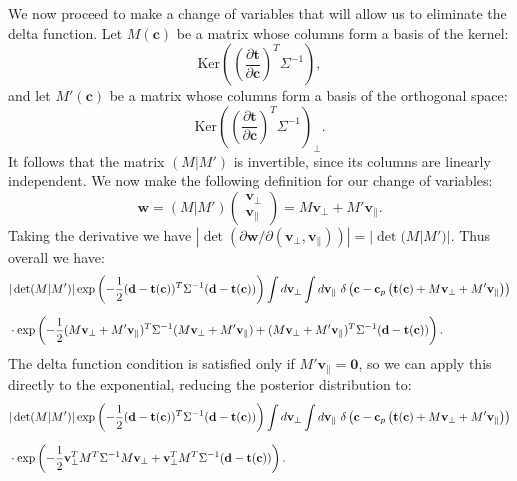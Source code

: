 \documentclass[withindex,glossary]{cam-thesis}
\renewcommand{\vec}[1]{\textbf{#1}} %
\begin{document}
We now proceed to make a change of variables that will allow us to eliminate the delta function. Let $M(\vec{c})$ be a matrix whose columns form a basis of the kernel:
\begin{equation}
\textrm{Ker}\left( \left( \frac{\partial \vec{t}}{\partial \vec{c}} \right)^T \Sigma^{-1} \right),
\end{equation}
and let $M'(\vec{c})$ be a matrix whose columns form a basis of the orthogonal space:
\begin{equation}
\textrm{Ker}\left( \left( \frac{\partial \vec{t}}{\partial \vec{c}} \right)^T \Sigma^{-1} \right)_{\perp}.
\end{equation}
It follows that the matrix $(M|M')$ is invertible, since its columns are linearly independent. We now make the following definition for our change of variables:
\begin{equation}
\vec{w} = (M|M') \begin{pmatrix} \vec{v}_{\perp} \\ \vec{v}_{\parallel} \end{pmatrix} = M\vec{v}_{\perp} + M'\vec{v}_{\parallel}.
\end{equation}
Taking the derivative we have $|\det(\partial \vec{w} / \partial (\vec{v}_{\perp}, \vec{v}_{\parallel}))| = |\det(M|M')|$. Thus overall we have:
\begin{align}
& |\det(M|M')|\exp\left( -\frac{1}{2}(\vec{d} - \vec{t}(\vec{c}))^T\Sigma^{-1} (\vec{d} - \vec{t}(\vec{c})) \right) \int d\vec{v}_{\perp} \int d\vec{v}_{\parallel}\ \delta\left(\vec{c} - \vec{c}_p\left(\vec{t}(\vec{c}) + M\vec{v}_{\perp} + M'\vec{v}_{\parallel}\right) \right)\notag\\[1.5ex]
& \cdot \exp\left( -\frac{1}{2} (M\vec{v}_{\perp} + M' \vec{v}_{\parallel})^T \Sigma^{-1} (M\vec{v}_{\perp} + M' \vec{v}_{\parallel}) + (M\vec{v}_{\perp} + M' \vec{v}_{\parallel})^T \Sigma^{-1} (\vec{d} - \vec{t}(\vec{c})) \right).
\end{align}
The delta function condition is satisfied only if $M'\vec{v}_{\parallel} = \vec{0}$, so we can apply this directly to the exponential, reducing the posterior distribution to:
\begin{align}
&|\det(M|M')| \exp\left( -\frac{1}{2}(\vec{d} - \vec{t}(\vec{c}))^T\Sigma^{-1} (\vec{d} - \vec{t}(\vec{c})) \right) \int d\vec{v}_{\perp} \int d\vec{v}_{\parallel}\ \delta\left(\vec{c} - \vec{c}_p\left(\vec{t}(\vec{c}) + M\vec{v}_{\perp} + M'\vec{v}_{\parallel}\right) \right)\notag\\[1.5ex]
& \cdot \exp\left( -\frac{1}{2} \vec{v}_{\perp}^T M^T \Sigma^{-1}M \vec{v}_{\perp} + \vec{v}_{\perp}^T M^T \Sigma^{-1} (\vec{d} - \vec{t}(\vec{c})) \right).
\end{align}
\end{document}
